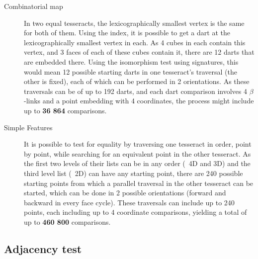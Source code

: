 \begin{description}
\item[Combinatorial map] In two equal tesseracts, the lexicographically smallest vertex is the same for both of them.
Using the index, it is possible to get a dart at the lexicographically smallest vertex in each.
As 4 cubes in each contain this vertex, and 3 faces of each of these cubes contain it, there are 12 darts that are embedded there.
Using the isomorphism test using signatures, this would mean 12 possible starting darts in one tesseract's traversal (the other is fixed), each of which can be performed in 2 orientations.
As these traversals can be of up to 192 darts, and each dart comparison involves 4 $\beta$-links and a point embedding with 4 coordinates, the process might include up to \textbf{36 864} comparisons.

\item[Simple Features] It is possible to test for equality by traversing one tesseract in order, point by point, while searching for an equivalent point in the other tesseract.
As the first two levels of their lists can be in any order (\ie\ 4D and 3D) and the third level list (\ie\ 2D) can have any starting point, there are 240 possible starting points from which a parallel traversal in the other tesseract can be started, which can be done in 2 possible orientations (forward and backward in every face cycle).
These traversals can include up to 240 points, each including up to 4 coordinate comparisons, yielding a total of up to \textbf{460 800} comparisons.
\end{description}

\subsection*{Adjacency test}

